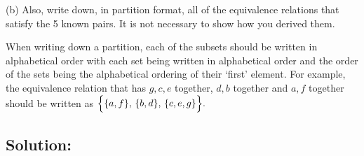 \documentclass[12pt]{article}
\begin{document}

	(b) Also, write down, in partition format, all of the equivalence relations
	that satisfy the 5 known pairs. It is not necessary to show how you derived them.

	When writing down a partition, each of the subsets should be written in
	alphabetical order with each set being written in alphabetical order and the
	order of the sets being the alphabetical ordering of their `first' element. For
	example, the equivalence relation that has $g,c,e$ together, $d,b$ together and
	$a,f$ together should be written as $\Bigl\{ \{a,f\}, \, \{b,d\},\, \{c,e,g\}\Bigr
	\}.$

	\subsection*{\textbf{Solution:}}
\end{document}
